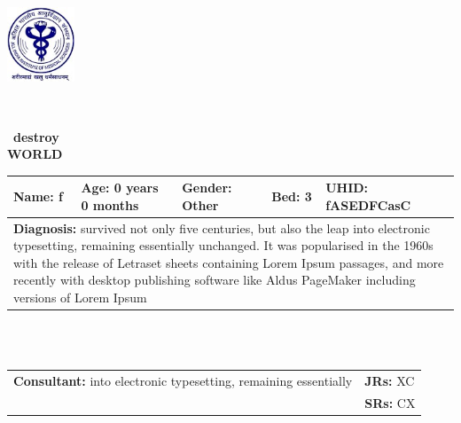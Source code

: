 \documentclass{article}
\begin{document}
\
\noindent
\begin{minipage}{0.2\textwidth} %
    \includegraphics[width=2cm]{RESOURCES/AIIMS_LOGO.png} %
\end{minipage}\
\vspace{-1cm} %
\hfill
\fontsize{9pt}{11pt}\selectfont %
\begin{center}\
    \textbf{destroy} \\
    \textbf{WORLD} \\
\end{center}
\fontsize{10pt}{12pt}\selectfont %
\noindent\begin{tabular}{|p{5cm}|p{4cm}|p{2.5cm}|p{1.5cm}|p{3cm}|}
    \hline
    \textbf{Name:} f & \textbf{Age:} 0 years 0 months & \textbf{Gender:} Other & \textbf{Bed:} 3 & \textbf{UHID:} fASEDFCasC \\
    \hline
    \multicolumn{5}{|p{19cm}|}{\textbf{Diagnosis:} survived not only five centuries, but also the leap into electronic typesetting, remaining essentially unchanged. It was popularised in the 1960s with the release of Letraset sheets containing Lorem Ipsum passages, and more recently with desktop publishing software like Aldus PageMaker including versions of Lorem Ipsum }\\
    \hline
\end{tabular}
\\
\\
\noindent\begin{tabular}{|p{11.3cm}|p{7.3cm}|}
     \hline
    \textbf{Consultant:} into electronic typesetting, remaining essentially      & \textbf{JRs:} XC \\
    \cline{2-2}
      & \textbf{SRs:} CX \\
    \hline
\end{tabular}
\vspace{0.1cm} %
\noindent
\end{document}
